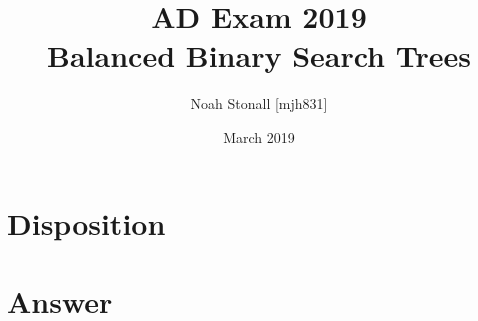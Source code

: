 \documentclass{article}
\title{AD Exam 2019\\Balanced Binary Search Trees}
\author{Noah Stonall [mjh831]}
\date{March 2019}
\begin{document}
\maketitle
\section*{Disposition}


\section*{Answer}

\end{document}
